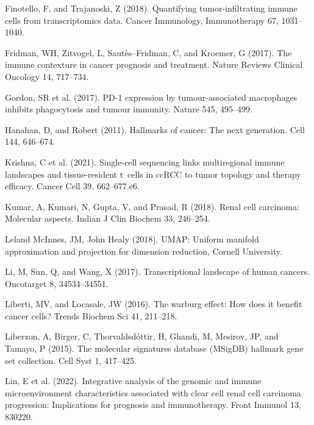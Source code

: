 \documentclass[
  parskip,
  oneside]{scrreprt}
\newlength{\cslhangindent}
\newlength{\cslentryspacingunit} %
\newenvironment{CSLReferences}[2] %
 {%
  \setlength{\parindent}{0pt}
  \ifodd #1
  \let\oldpar\par
  \def\par{\hangindent=\cslhangindent\oldpar}
  \fi
  \setlength{\parskip}{#2\cslentryspacingunit}
 }%
 {}
\begin{document}
\begin{CSLReferences}{0}{0}
\leavevmode{}%
Finotello, F, and Trajanoski, Z (2018). Quantifying tumor-infiltrating
immune cells from transcriptomics data. Cancer Immunology, Immunotherapy
67, 1031--1040.

\leavevmode{}%
Fridman, WH, Zitvogel, L, Sautès--Fridman, C, and Kroemer, G (2017). The
immune contexture in cancer prognosis and treatment. Nature Reviews
Clinical Oncology 14, 717--734.

\leavevmode{}%
Gordon, SR et al. (2017). PD-1 expression by tumour-associated
macrophages inhibits phagocytosis and tumour immunity. Nature 545,
495--499.

\leavevmode{}%
Hanahan, D, and Robert (2011). Hallmarks of cancer: The next generation.
Cell 144, 646--674.

\leavevmode{}%
Krishna, C et al. (2021). Single-cell sequencing links multiregional
immune landscapes and tissue-resident t~cells in ccRCC to tumor topology
and therapy efficacy. Cancer Cell 39, 662--677.e6.

\leavevmode{}%
Kumar, A, Kumari, N, Gupta, V, and Prasad, R (2018). Renal cell
carcinoma: Molecular aspects. Indian J Clin Biochem 33, 246--254.

\leavevmode{}%
Leland McInnes, JM, John Healy (2018). UMAP: Uniform manifold
approximation and projection for dimension reduction, Cornell
University.

\leavevmode{}%
Li, M, Sun, Q, and Wang, X (2017). Transcriptional landscape of human
cancers. Oncotarget 8, 34534--34551.

\leavevmode{}%
Liberti, MV, and Locasale, JW (2016). The warburg effect: How does it
benefit cancer cells? Trends Biochem Sci 41, 211--218.

\leavevmode{}%
Liberzon, A, Birger, C, Thorvaldsdóttir, H, Ghandi, M, Mesirov, JP, and
Tamayo, P (2015). The molecular signatures database (MSigDB) hallmark
gene set collection. Cell Syst 1, 417--425.

\leavevmode{}%
Lin, E et al. (2022). Integrative analysis of the genomic and immune
microenvironment characteristics associated with clear cell renal cell
carcinoma progression: Implications for prognosis and immunotherapy.
Front Immunol 13, 830220.


\end{CSLReferences}
\end{document}
